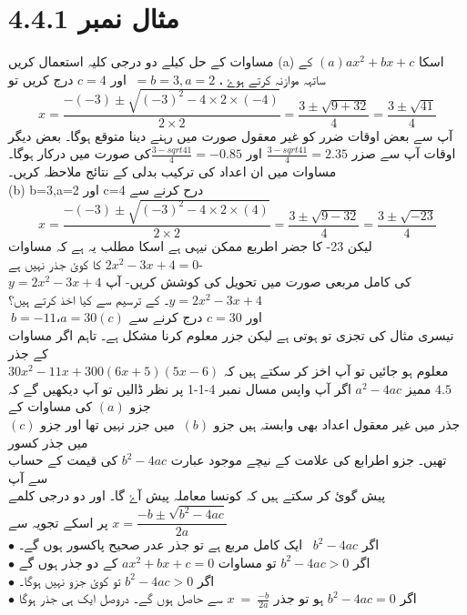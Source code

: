 \section*{
مثال نمبر
 4.4.1}
مساوات کے حل کیلے دو درجی کلیہ استعمال کریں
(a)
اسکا  $(a) ax^{2} +bx +c$ کے ساتہہ موازنہ کرتے ہوۓ ، $\ =b=3, a=2 $ اور $ c=4 $ درج کریں 
تو
\[x=\frac{-(-3)\pm\sqrt{(-3)^{2}-4\times2\times(-4)}}{2\times2}=\frac{3\pm\sqrt{9+32}}{4}=\frac{3\pm\sqrt{41}}{4}\]
 آپ سے بعض اوقات ضرر کو غیر معقول صورت میں رہنے دینا متوقع ہوگا۔ بعض دیگر اوقات آپ 
سے صزر $\frac{3-sqrt{41}}{4} = 2.35 $ اور $  \frac{3-sqrt{41}}{4} = -0.85 $کی صورت میں درکار ہوگا۔ مساوات میں ان اعداد کی
ترکیب بدلی کے نتائج ملاحظہ کریں۔\\
(b)
 b=3,a=2 اور c=4
 درح کرنے سے 
\[x=\frac{-(-3)\pm\sqrt{(-3)^{2}-4\times2\times(4)}}{2\times2}=\frac{3\pm\sqrt{9-32}}{4}=\frac{3\pm\sqrt{-23}}{4}\]
لیکن 23- کا جضر اطربع ممکن نیہی ہے اسکا مطلب یہ ہے کہ مساوات  $ 2x^{2}-3x+4=0 $ کا 
کوئ جذر نہیں ہے-\\
 $y=2x^{2}-3x+4$
   کی کامل مربعی صورت میں تحویل کی کوشش کریں- آپ
    $ y=2x^{2} -3x +4$۔
   کے ترسیم سے کیا اخذ کرتے ہیں؟ \\ 
\newpage
$\ b = -11،a=30(c)$ اور $ c=30 $ درج کرنے سے \\
تیسری مثال کی تجزی تو ہوتی ہے لیکن جزر معلوم کرنا مشکل ہے۔ تاہم اگر مساوات کے جذر \\
معلوم ہو جائیں تو آپ اخز کر سکتے ہیں کہ $ 30x^{2} -11x + 300(6x+5)(5x-6)$
$4.5$ ممیز $a^{2} -4ac$
اگر آپ واپس مسال نمبر 4-1-1 پر نظر ڈالیں تو آپ دیکھیں گے کہ جزو $(a)$ کی مساوات کے \\
 جذر میں غیر معقول اعداد بھی وابستہ ہیں جزو $ \ (b) $ میں جزر نہیں تھا اور جزو $(c)$ میں جذر کسور \\
 تھیں۔
 جزو اطرابع کی علامت کے نیچے موجود عبارت $b^{2}-4ac$ کی قیمت کے حساب سے آپ\\
 پیش گوئ کر سکتے ہیں کہ کونسا معاملہ پیش آۓ گا۔ اور دو درجی کلمے $ x= \dfrac{-b \pm \sqrt{b^{2}-4ac}}{2a}$ پر اسکے 
تجویہ سے \\
$\bullet$ اگر $ b^{2}-4ac$ \ ایک کامل مربع ہے تو جذر عدر صحیح پاکسور ہوں گے۔\\
$\bullet$ اگر $ b^{2} - 4ac > 0 $ تو مساوات $ ax^{2} + bx + c = 0 $ کے دو جذر ہوں گے\\
$ \hspace{10pt} $ \\
$\bullet$ اگر $b^{2}-4ac>0$ تو کوئ جزو نہیں ہوگا۔\\
$\bullet$ اگر $b^{2}-4ac=0$ ہو تو جذر $ x\ =\ \frac{-b}{2a} $ سے حاصل ہوں گے۔ دروصل ایک ہی جذر ہوگا\\
